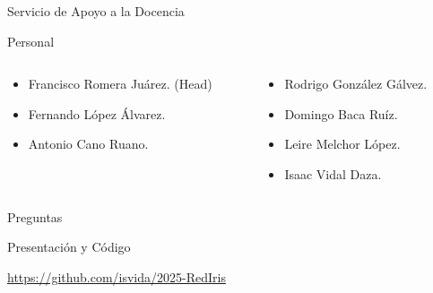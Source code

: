 \documentclass[aspectratio=169]{beamer}
\begin{document}
\begin{frame}{Servicio de Apoyo a la Docencia}
    \begin{block}{\centering Personal}
        \begin{columns}
            \begin{column}{0.5\linewidth}

                \begin{itemize}
                    \item Francisco Romera Juárez. (Head)
                    \item Fernando López Álvarez.
                    \item Antonio Cano Ruano.
                \end{itemize}

            \end{column}
            \begin{column}{0.5\linewidth}
                \begin{itemize}
                    \item Rodrigo González Gálvez.
                    \item Domingo Baca Ruíz.
                    \item Leire Melchor López.
                    \item Isaac Vidal Daza.
                \end{itemize}
            \end{column}
        \end{columns}
    \end{block}
\end{frame}


\begin{frame}{Preguntas}
    \begin{block}{Presentación y Código}
    \begin{center}
        \href{https://github.com/isvida/2025-RedIris}{https://github.com/isvida/2025-RedIris}
    \end{center}
\end{block}
\end{frame}
\end{document}
